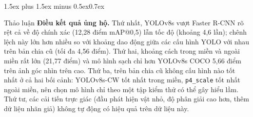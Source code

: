 \documentclass[10pt,journal,letterpaper]{IEEEtran}
\makeatletter
\renewcommand\section{\@startsection{section}{1}{\z@}%
  {1.5ex plus 1.5ex minus 0.5ex}{0.7ex}{\normalfont\scshape\raggedright}}
\makeatother
\begin{document}
\section{Thảo luận}
\textbf{Điều kết quả ủng hộ.} Thứ nhất, YOLOv8s vượt Faster R-CNN rõ rệt cả về độ chính xác (12,28 điểm mAP@0,5) lẫn tốc độ (khoảng 4,6 lần); chênh lệch này lớn hơn nhiều so với khoảng dao động giữa các cấu hình YOLO với nhau trên bản chia cũ (tối đa 4,56 điểm). Thứ hai, khoảng cách trong miền và ngoài miền rất lớn (21,77 điểm) và mô hình sạch chỉ hơn YOLOv8s COCO 5,66 điểm trên ảnh góc nhìn trên cao. Thứ ba, trên bản chia cũ không cấu hình nào tốt nhất ở cả hai bối cảnh: YOLOv8s-CW tốt nhất trong miền, \texttt{p4\_scale} tốt nhất ngoài miền, nên chọn mô hình chỉ theo một tập kiểm thử có thể gây hiểu lầm. Thứ tư, các cải tiến trực giác (đầu phát hiện vật nhỏ, độ phân giải cao hơn, thêm dữ liệu nhãn giả) không tự động có hiệu quả trên dữ liệu này.
\end{document}
